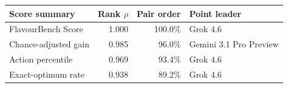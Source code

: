 \begin{tabular}{@{}l r r l@{}}
\toprule
Score summary & Rank $\rho$ & Pair order & Point leader \\
\midrule
FlavourBench Score & 1.000 & 100.0\% & Grok 4.6 \\
Chance-adjusted gain & 0.985 & 96.0\% & Gemini 3.1 Pro Preview \\
Action percentile & 0.969 & 93.4\% & Grok 4.6 \\
Exact-optimum rate & 0.938 & 89.2\% & Grok 4.6 \\
\bottomrule
\end{tabular}

